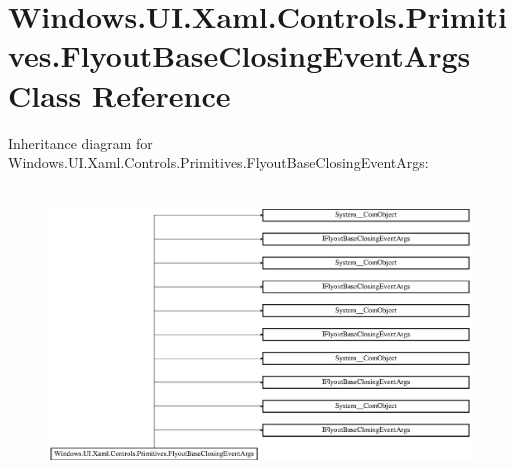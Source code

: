 \hypertarget{class_windows_1_1_u_i_1_1_xaml_1_1_controls_1_1_primitives_1_1_flyout_base_closing_event_args}{}\section{Windows.\+U\+I.\+Xaml.\+Controls.\+Primitives.\+Flyout\+Base\+Closing\+Event\+Args Class Reference}
\label{class_windows_1_1_u_i_1_1_xaml_1_1_controls_1_1_primitives_1_1_flyout_base_closing_event_args}
Inheritance diagram for Windows.\+U\+I.\+Xaml.\+Controls.\+Primitives.\+Flyout\+Base\+Closing\+Event\+Args\+:\begin{figure}[H]
\begin{center}
\leavevmode
\includegraphics[height=7.817258cm]{class_windows_1_1_u_i_1_1_xaml_1_1_controls_1_1_primitives_1_1_flyout_base_closing_event_args}
\end{center}
\end{figure}
